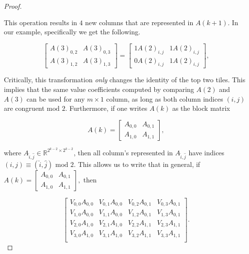 \documentclass[12pt]{article}
\theoremstyle{plain}
\theoremstyle{definition}
\theoremstyle{remark}
\theoremstyle{definition}
\newcommand{\lablnode}[3]{\node[shape=circle,draw=none,fill=none, inner sep=0pt,minimum size=5pt] (A) at ( #1 , #2 ) {#3};}
\begin{document}
\begin{proof}
\begin{center}
\end{center}

This operation results in $4$ new columns that are represented in $A(k+1)$. In our example, specifically we get the following. 

$$
\begin{bmatrix} 
    A(3)_{0,2} & A(3)_{0,3} \\ 
    A(3)_{1,2} & A(3)_{1,3} 
\end{bmatrix} = 
\begin{bmatrix} 
    1A(2)_{i,j} & 1A(2)_{i,j} \\ 
    0A(2)_{i,j} & 1A(2)_{i,j} 
\end{bmatrix},
$$

Critically, this transformation \textit{only} changes the identity of the top two tiles. This implies that the same value coefficients computed by comparing $A(2)$ and $A(3)$ can be used for any $m \times 1$ column, as long as both column indices $(i,j)$ are congruent $\text{mod } 2$. Furthermore, if one writes $A(k)$ as the block matrix

$$A(k) = \begin{bmatrix} A_{0,0} & A_{0,1} \\ A_{1,0} & A_{1,1} \end{bmatrix},$$

where $A_{\hat{i},\hat{j}} \in \mathbb{R}^{2^{k-2} \times 2^{k-2}}$, then all column's represented in $A_{\hat{i},\hat{j}}$ have indices $(i,j) \equiv (\hat{i},\hat{j}) \text{ mod } 2$. This allows us to write that in general, if $A(k) = \begin{bmatrix} A_{0,0} & A_{0,1} \\ A_{1,0} & A_{1,1} \end{bmatrix},$
then

\begin{equation}\label{eqn: coefficient matrix prod}
    \begin{bmatrix}
        V_{0,0}A_{0,0} & V_{0,1}A_{0,0} & V_{0,2}A_{0,1} & V_{0,3}A_{0,1} \\
        V_{1,0}A_{0,0} & V_{1,1}A_{0,0} & V_{1,2}A_{0,1} & V_{1,3}A_{0,1} \\
        V_{2,0}A_{1,0} & V_{2,1}A_{1,0} & V_{2,2}A_{1,1} & V_{2,3}A_{1,1} \\
        V_{3,0}A_{1,0} & V_{3,1}A_{1,0} & V_{3,2}A_{1,1} & V_{3,3}A_{1,1} \\
    \end{bmatrix}.
\end{equation}



\end{proof}
\end{document}
